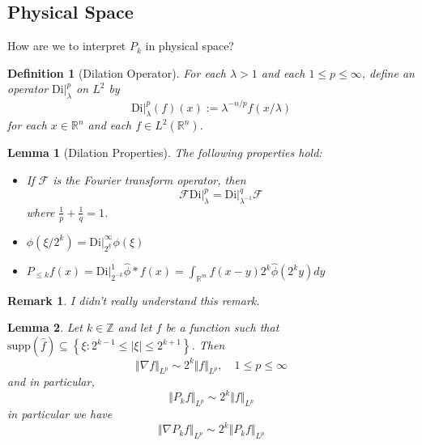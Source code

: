 \documentclass{article}
\newtheorem{definition}{Definition}
\newtheorem{lemma}{Lemma}
\newtheorem{remark}{Remark}
\def\R{\mathbb{R}} %
\def\Z{\mathbb{Z}} %
\newcommand{\di}{\left. \mathrm{Di} \right|}
\newcommand{\norm}[1]{\Vert #1 \Vert }
\begin{document}
\subsection{Physical Space}
How are we to interpret $P_{k}$ in physical space?
\begin{definition}[Dilation Operator]
  \label{def:dilation-operator}
  For each $\lambda>1$ and each $1 \leq p \leq \infty$, define an operator
  $\di_{\lambda}^{p}$ on $L^{2}$ by
  \begin{equation*}
    \di_{\lambda}^{p}(f)(x):= \lambda^{-n/p}f(x/\lambda)
  \end{equation*}
  for each $x\in \R^n$ and each $f\in L^{2}(\R^n)$. 
\end{definition}
\begin{lemma}[Dilation Properties]
  \label{lem:dilation-properties}
  The following properties hold:
  \begin{itemize}
    \item If $\mathcal{F}$ is the Fourier transform operator, then
    \begin{equation*}
      \mathcal{F}\di_{\lambda}^{p} = \di_{\lambda^{-1}}^{q}\mathcal{F}
    \end{equation*}
    where $\frac{1}{p}+\frac{1}{q}=1$.
    \item $\phi(\xi/2^{k})= \di_{2^{k}}^{\infty}\phi(\xi)$ 
    \item $P_{\leq k}f(x)=\di_{2^{-k}}^{1}\hat{\phi}*f(x) = \int_{\R^m}f(x-y)2^{k}\hat{\phi}(2^{k}y)dy $
  \end{itemize}
\end{lemma}
\begin{remark}
  I didn't really understand this remark. 
\end{remark}
\begin{lemma}
  \label{lem:littlewood-paley-Lp-lemma}
  Let $k\in \Z$ and let $f$ be a function such that
  $\text{supp}(\hat{f}) \subseteq \left\{\xi: 2^{k-1}\leq |\xi| \leq
    2^{k+1}\right\}$. Then
  \begin{equation*}
    \norm{\nabla f}_{L^{p}} \sim 2^{k} \norm{f}_{L^{p}}, \quad 1 \leq  p\leq \infty
  \end{equation*}
  and in particular,
  \begin{equation*}
    \norm{P_{k}f}_{L^{p}} \sim 2^{k} \norm{f}_{L^{p}}
  \end{equation*}
  in particular we have
  \begin{equation}\label{eq:8}
    \norm{\nabla P_{k}f}_{L^{p}} \sim 2^{k} \norm{P_{k}f}_{L^{p}}
  \end{equation}
\end{lemma}
\end{document}
